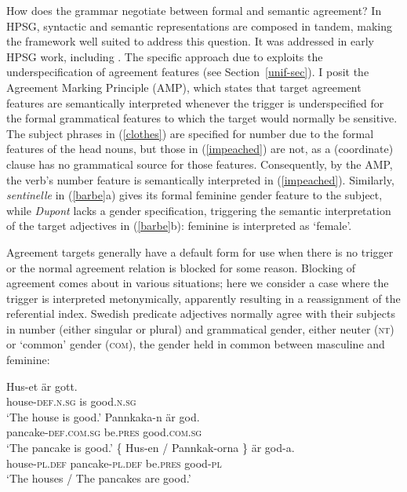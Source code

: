 \documentclass[output=paper
                ,modfonts
                ,nonflat
	        ,collection
	        ,collectionchapter
	        ,collectiontoclongg
 	        ,biblatex
                ,babelshorthands
                ,newtxmath
                ,draftmode
                ,colorlinks, citecolor=brown
]{./langsci/langscibook}
\begin{document}
{How does the grammar negotiate between formal and semantic agreement?  In HPSG, syntactic and semantic representations are composed in tandem, making the framework well suited to address this question.   It was addressed in early HPSG work, including \cite[Chapter~1]{Pollard+Sag:1994}.   The specific approach due to \cite{Wechsler:2011} exploits the underspecification of agreement features (see Section~\ref{unif-sec}).  I posit the Agreement Marking Principle (AMP), which states that target agreement features are semantically interpreted whenever the trigger is underspecified for the formal grammatical features to which the target would normally be sensitive.   The subject phrases in (\ref{clothes}) are specified for number due to the formal features of the head nouns, but those in (\ref{impeached}) are not, as a (coordinate) clause has no grammatical source for those features.  Consequently, by the AMP, the verb's number feature is semantically interpreted in (\ref{impeached}).  Similarly, \textit{sentinelle} in (\ref{barbe}a) gives its formal feminine gender feature to the subject, while \textit{Dupont} lacks a gender specification, triggering the semantic interpretation of the target adjectives in (\ref{barbe}b): feminine is interpreted as `female'.    

Agreement targets generally have a default form for use when there is no trigger or the normal agreement relation is blocked for some reason.   
Blocking of agreement comes about in various situations; here we  consider a case where the trigger is interpreted metonymically,  apparently resulting in a reassignment of the referential index.  Swedish predicate adjectives normally agree with their subjects in number (either singular or plural) and grammatical gender, either neuter (\textsc{nt}) or `common' gender (\textsc{com}), the gender held in common between masculine and feminine: 

\begin{exe} 
\ex \label{huset}
 \begin{xlist}
\ex 
\gll 	Hus-et 	är	gott. \\
		house-\textsc{def.n.sg}	is	good.\textsc{n.sg} \\
\glt	`The house is good.’
\ex   
\gll  Pannkaka-n 	är	god. \\
	pancake-\textsc{def.com.sg} 	be.\textsc{pres} 	good.\textsc{com.sg} \\
\glt	`The pancake is good.’
\ex   
\gll   \{   Hus-en / Pannkak-orna 	\}	är	god-a. \\
	   {}   house-\textsc{pl.def} {} pancake-\textsc{pl.def} {} be.\textsc{pres} good-\textsc{pl}  \\
\glt	`The houses / The pancakes are good.’
\end{xlist}
\end{exe}

}
\end{document}
